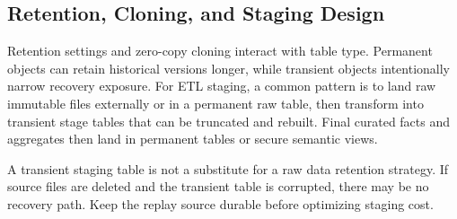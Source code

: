 \subsection{Retention, Cloning, and Staging Design}
Retention settings and zero-copy cloning interact with table type. Permanent objects can retain historical versions longer, while transient objects intentionally narrow recovery exposure. For ETL staging, a common pattern is to land raw immutable files externally or in a permanent raw table, then transform into transient stage tables that can be truncated and rebuilt. Final curated facts and aggregates then land in permanent tables or secure semantic views.
\begin{notebox}
A transient staging table is not a substitute for a raw data retention strategy. If source files are deleted and the transient table is corrupted, there may be no recovery path. Keep the replay source durable before optimizing staging cost.
\end{notebox}
